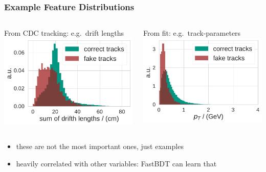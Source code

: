 \documentclass[18pt, aspectratio=169]{beamer}
\begin{document}
\begin{frame} 
  \frametitle{Example Feature Distributions}
  \begin{columns}[t]
    \begin{column}{.5\textwidth}
      \center
      From CDC tracking: e.g.\ drift lengths
      \includegraphics[width=\textwidth]{figures/cdc-qi-new/drift_length_sum.pdf}
    \end{column}
    \begin{column}{.5\textwidth}
      \center
      From fit: e.g.\ track-parameters
    \includegraphics[width=\textwidth]{figures/combined-qi/pt_distributions.pdf}
    \end{column}
  \end{columns}
  \begin{itemize}
  \item these are not the most important ones, just examples
  \item heavily correlated with other variables: FastBDT can learn that
  \end{itemize}
\end{frame}
\end{document}
